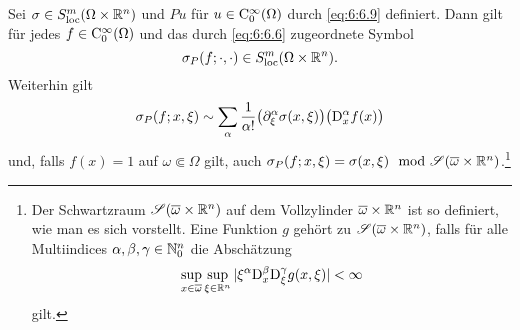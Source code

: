 \begin{lem}\label{lem:5.3}
Sei $\sigma\in S^m_{\rm loc}(\Omega\times\mathbb R^n)$ und $Pu$ für $u\in\mathrm C_0^\infty(\Omega)$ durch \eqref{eq:6:6.9} definiert. Dann gilt für jedes $f\in\mathrm C_0^\infty(\Omega)$
und das durch \eqref{eq:6:6.6} zugeordnete Symbol
\begin{equation}
    \sigma_P(f;\cdot,\cdot)\in S^m_{\rm loc}(\Omega\times\mathbb R^n). 
\end{equation}
Weiterhin gilt
\begin{equation}
   \sigma_P(f;x,\xi) \sim \sum_{\alpha}  \frac{1}{\alpha!} \big( \partial_\xi^\alpha \sigma(x,\xi) \big) \big(\mathrm D_x^\alpha f(x)\big)
\end{equation}
und, falls $f(x)=1$ auf $\omega\Subset\Omega$ gilt, auch $\sigma_P(f;x,\xi)=\sigma(x,\xi) \mod\mathscr S(\overline{\omega}\times\mathbb R^n)$.\footnote{Der Schwartzraum $\mathscr S(\overline\omega\times\mathbb R^n)$ auf dem Vollzylinder $\overline\omega\times\mathbb R^n$ ist so definiert, wie man es sich vorstellt. Eine Funktion $g$ gehört zu $\mathscr S(\overline\omega\times\mathbb R^n)$, falls für alle Multiindices $\alpha,\beta,\gamma\in\mathbb N_0^n$ die Abschätzung
\begin{equation}
  \sup_{x\in\overline\omega}\sup_{\xi\in\mathbb R^n} | \xi^\alpha \mathrm D_x^\beta \mathrm D_\xi^\gamma g(x,\xi) | < \infty
\end{equation}
gilt.}
\end{lem}
